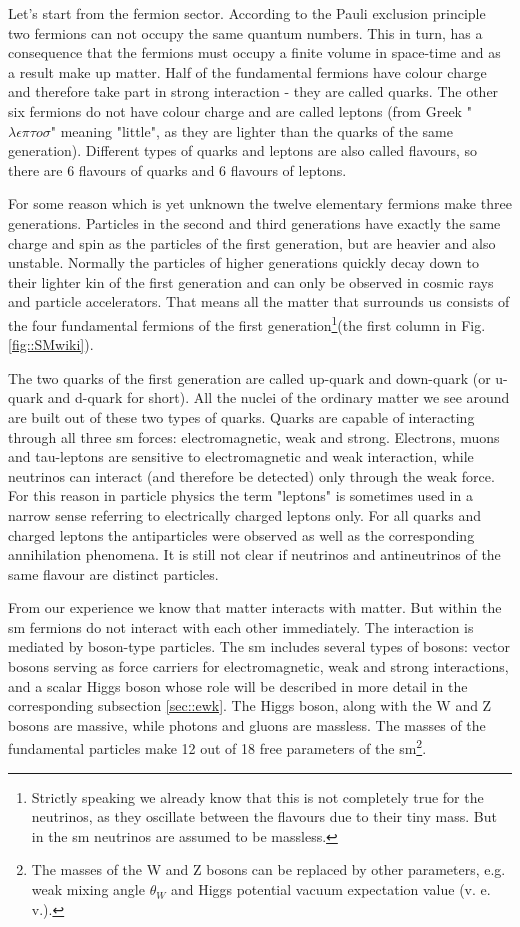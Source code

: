 	Let's start from the fermion sector. According to the Pauli exclusion principle\cite{pep} two fermions can not occupy the same quantum numbers. This in turn, has a consequence that the fermions must occupy a finite volume in space-time and as a result make up matter. Half of the fundamental fermions have colour charge and therefore take part in strong interaction - they are called quarks. The other six fermions do not have colour charge and are called leptons (from Greek "$\lambda \epsilon \pi \tau o \sigma$" meaning "little", as they are lighter than the quarks of the same generation). Different types of quarks and leptons are also called flavours, so there are 6 flavours of quarks and 6 flavours of leptons.
	
	For some reason which is yet unknown the twelve elementary fermions make three generations. Particles in the second and third generations have exactly the same charge and spin as the particles of the first generation, but are heavier and also unstable.  Normally the particles of higher generations quickly decay down to their lighter kin of the first generation and can only be observed in cosmic rays and particle accelerators. That means all the matter that surrounds us consists of the four fundamental fermions of the first generation\footnote{Strictly speaking we already know that this is not completely true for the neutrinos, as they oscillate between the flavours due to their tiny mass. But in the \gls{sm} neutrinos are assumed to be massless.}(the first column in Fig. \ref{fig::SMwiki}).
	
	The two quarks of the first generation are called up-quark and down-quark (or u-quark and d-quark for short). All the nuclei of the ordinary matter we see around are built out of these two types of quarks. Quarks are capable of interacting through all three \gls{sm} forces: electromagnetic, weak and strong. Electrons, muons and tau-leptons are sensitive to electromagnetic and weak interaction, while neutrinos can interact (and therefore be detected) only through the weak force. For this reason in particle physics the term "leptons" is sometimes used in a narrow sense referring to electrically charged leptons only. For all quarks and charged leptons the antiparticles were observed as well as the corresponding annihilation phenomena. It is still not clear if neutrinos and antineutrinos of the same flavour are distinct particles.
	
	From our experience we know that matter interacts with matter. But within the \gls{sm} fermions do not interact with each other immediately. The interaction is mediated by boson-type particles. The \gls{sm} includes several types of bosons: vector bosons serving as force carriers for electromagnetic, weak and strong interactions, and a scalar Higgs boson whose role will be described in more detail in the corresponding subsection \ref{sec::ewk}. The Higgs boson, along with the W and Z bosons are massive, while photons and gluons are massless. The masses of the fundamental particles make 12 out of 18 free parameters of the \gls{sm}\footnote{The masses of the W and Z bosons can be replaced by other parameters, e.g. weak mixing angle $\theta_W$ and Higgs potential vacuum expectation value (v. e. v.).}. 
	
